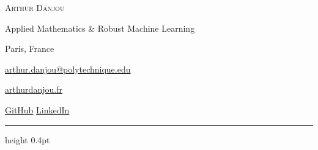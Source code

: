 \begin{minipage}[t]{0.54\textwidth}
  \vspace{0pt}
  {\huge\scshape\color{accent}Arthur Danjou}\par
  \vspace{3pt}
  {\normalsize Applied Mathematics \& Robust Machine Learning}\par
  {\small\color{black!60}Paris, France}
\end{minipage}\hfill
\begin{minipage}[t]{0.44\textwidth}
  \vspace{0pt}
  \raggedleft\small
  \href{mailto:arthur.danjou@polytechnique.edu}
    {{\color{accent}\faEnvelope}\enspace arthur.danjou@polytechnique.edu}\par
  \vspace{2pt}
  \href{https://links.arthurdanjou.fr/website}
    {{\color{accent}\faGlobe}\enspace arthurdanjou.fr}\par
  \vspace{2pt}
  \href{https://links.arthurdanjou.fr/github}
    {{\color{accent}\faGithub}\enspace GitHub}
  \quad
  \href{https://links.arthurdanjou.fr/linkedin}
    {{\color{accent}\faLinkedin}\enspace LinkedIn}
\end{minipage}\par
\vspace{8pt}
{\color{accent!35}\hrule height 0.4pt}
